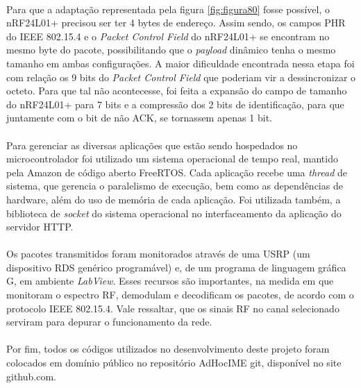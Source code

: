 \paragraph{} Para que a adaptação representada pela figura \ref{fig:figura80} fosse possível, o nRF24L01+ precisou ser ter 4 bytes de endereço. Assim sendo, os campos PHR do IEEE 802.15.4 e o \textit{Packet Control Field} do nRF24L01+ se encontram no mesmo byte do pacote,  possibilitando que o \textit{payload} dinâmico tenha o mesmo tamanho em ambas configurações. A maior dificuldade encontrada nessa etapa foi com relação os 9 bits do \textit{Packet Control Field} que poderiam vir a dessincronizar o octeto. Para que tal não acontecesse, foi feita a expansão do campo de tamanho do nRF24L01+ para 7 bits e a compressão dos 2 bits de identificação, para que juntamente com o bit de não ACK, se tornassem apenas 1 bit. 


\paragraph{} Para gerenciar as diversas aplicações que estão sendo hospedados no microcontrolador foi utilizado um sistema operacional de tempo real, mantido pela Amazon de código aberto FreeRTOS. Cada aplicação recebe uma \textit{thread} de sistema, que gerencia o paralelismo de execução, bem como as dependências de hardware, além do uso de memória de cada aplicação. Foi utilizada também, a biblioteca de \textit{socket} do sistema operacional no interfaceamento da aplicação do servidor HTTP.  

\paragraph{} Os pacotes transmitidos foram monitorados através de uma USRP (um dispositivo RDS genérico programável) e, de um programa de linguagem gráfica G, em ambiente \textit{LabView}. Esses recursos são importantes, na medida em que monitoram o espectro RF, demodulam e decodificam os pacotes, de acordo com o protocolo IEEE 802.15.4. Vale ressaltar, que os sinais RF no canal selecionado serviram para depurar o funcionamento da rede. 

\paragraph{} Por fim, todos os códigos utilizados no desenvolvimento deste projeto foram colocados em domínio público no repositório AdHocIME git, disponível no site github.com.

